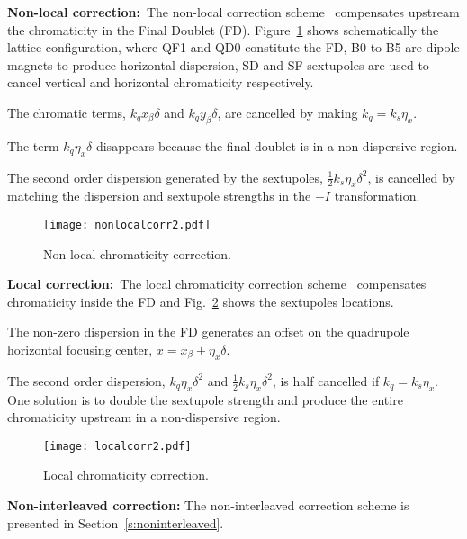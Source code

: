 %
\textbf{Non-local correction:}~The non-local correction scheme~\cite{Brown:1988} compensates upstream the chromaticity in the Final Doublet (FD). Figure~\ref{f-Non-local} shows schematically the lattice configuration, where QF1 and QD0 constitute the FD, B0 to B5 are dipole magnets to produce horizontal dispersion, SD and SF sextupoles are used to cancel vertical and horizontal chromaticity respectively.\par
The chromatic terms, $k_q x_\beta\delta$ and $k_q y_\beta\delta$, are cancelled by making $k_q=k_s\eta_x$.\par
The term $k_q\eta_x\delta$ disappears because the final doublet is in a non-dispersive region.\par
The second order dispersion generated by the sextupoles, $\frac{1}{2}k_s\eta_x\delta^2$, is cancelled by matching the dispersion and sextupole strengths in the $-I$ transformation.
\begin{figure}[h]
   \centering
   \texttt{[image: nonlocalcorr2.pdf]}
   \caption{Non-local chromaticity correction.}
   \label{f-Non-local}
\end{figure}\par
\textbf{Local correction:}~The local chromaticity correction scheme~\cite{Raimondi:2000} compensates chromaticity inside the FD and Fig.~\ref{f-local} shows the sextupoles locations.\par
The non-zero dispersion in the FD generates an offset on the quadrupole horizontal focusing center, $x=x_\beta+\eta_x\delta$.\par
The second order dispersion, $k_q\eta_x\delta^2$ and $\frac{1}{2}k_s\eta_x\delta^2$, is half cancelled if $k_q=k_s\eta_x$. One solution is to double the sextupole strength and produce the entire chromaticity upstream in a non-dispersive region.\par
\begin{figure}[!htb]
   \centering
   \texttt{[image: localcorr2.pdf]}
   \caption{Local chromaticity correction.}
   \label{f-local}
\end{figure}
\textbf{Non-interleaved correction:} The non-interleaved correction scheme is presented in Section~\ref{s:noninterleaved}.
